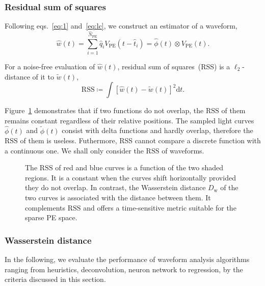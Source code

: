 \subsubsection{Residual sum of squares}
\label{sec:rss}

Following eqs.~\eqref{eq:1} and~\eqref{eq:lc}, we construct an estimator of a waveform,
\begin{equation}
  \label{eq:w-hat}
  \hat{w}(t) = \sum_{i=1}^{\hat{N}_\mathrm{PE}}\hat{q}_i V_\mathrm{PE}(t-\hat{t}_i) = \hat{\phi}(t) \otimes V_\mathrm{PE}(t).
\end{equation}

For a noise-free evaluation of $\hat{w}(t)$, residual sum of squares~(RSS) is a $\ell_2$-distance of it to $\tilde{w}(t)$,
\begin{equation}
  \label{eq:rss}
  \mathrm{RSS} \coloneqq\int\left[\hat{w}(t) - \tilde{w}(t)\right]^2\mathrm{d}t.
\end{equation}

Figure~\ref{fig:l2} demonstrates that if two functions do not overlap, the $\mathrm{RSS}$ of them remains constant regardless of their relative positions.  The sampled light curves $\hat{\phi}(t)$ and $\tilde{\phi}(t)$ consist with delta functions and hardly overlap, therefore the $\mathrm{RSS}$ of them is useless.  Futhermore, RSS cannot compare a discrete function with a continuous one.  We shall only consider the $\mathrm{RSS}$ of waveforms.

\begin{figure}[H]
  \centering
  \resizebox{0.6\textwidth}{!}{}
  \caption{\label{fig:l2} The $\mathrm{RSS}$ of red and blue curves is a function of the two shaded regions. It is a constant when the curves shift horizontally provided they do not overlap.  In contrast, the Wasserstein distance $D_\mathrm{w}$ of the two curves is associated with the distance between them.  It complements $\mathrm{RSS}$ and offers a time-sensitive metric suitable for the sparse PE space.}
\end{figure}

\subsubsection{Wasserstein distance}
\label{sec:W-dist}



In the following, we  evaluate the performance of waveform analysis algorithms ranging from heuristics, deconvolution, neuron network to regression, by the criteria discussed in this section.

